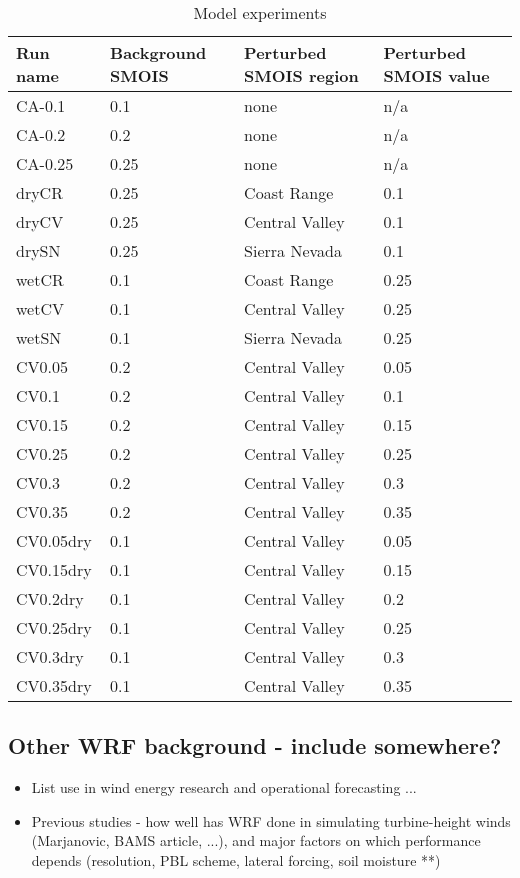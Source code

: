 \documentclass[12pt]{amsart}
\begin{document}
\begin{table}
\begin{tabular}{l l l l}
\hline
Run name & Background SMOIS & Perturbed SMOIS region & Perturbed SMOIS value \\
\hline
CA-0.1 & 0.1 & none & n/a \\
CA-0.2 & 0.2 & none & n/a \\
CA-0.25 & 0.25 & none & n/a \\
dryCR & 0.25 & Coast Range & 0.1 \\
dryCV & 0.25 & Central Valley & 0.1 \\
drySN & 0.25 & Sierra Nevada & 0.1 \\
wetCR & 0.1 & Coast Range & 0.25 \\
wetCV & 0.1 & Central Valley & 0.25 \\
wetSN & 0.1 & Sierra Nevada & 0.25 \\
CV0.05 & 0.2 & Central Valley & 0.05 \\
CV0.1 & 0.2 & Central Valley & 0.1 \\
CV0.15 & 0.2 & Central Valley & 0.15 \\
CV0.25 & 0.2 & Central Valley & 0.25 \\
CV0.3 & 0.2 & Central Valley & 0.3 \\
CV0.35 & 0.2 & Central Valley & 0.35 \\
CV0.05dry & 0.1 & Central Valley & 0.05 \\
CV0.15dry & 0.1 & Central Valley & 0.15 \\
CV0.2dry & 0.1 & Central Valley & 0.2 \\
CV0.25dry & 0.1 & Central Valley & 0.25 \\
CV0.3dry & 0.1 & Central Valley & 0.3 \\
CV0.35dry & 0.1 & Central Valley & 0.35 \\
\hline
\end{tabular}
\caption{Model experiments}
\label{table:windSol_runlist}
\end{table}




\subsection{Other WRF background - include somewhere?}

\begin{itemize}
\item List use in wind energy research and operational forecasting ...
\item Previous studies - how well has WRF done in simulating turbine-height winds (Marjanovic, BAMS article, ...), and major factors on which performance depends (resolution, PBL scheme, lateral forcing, soil moisture **)
\end{itemize}
\end{document}
